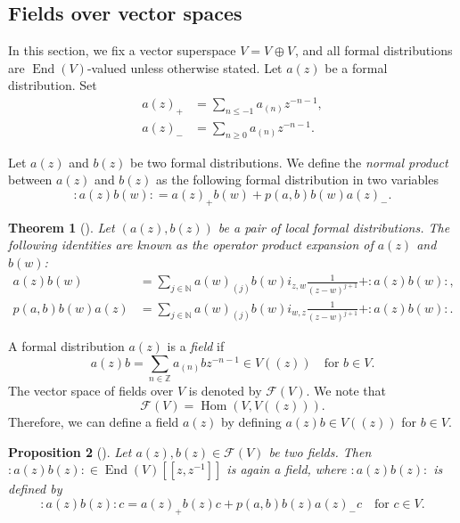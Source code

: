 \documentclass[a4paper, 12pt, reqno]{amsart}
\newtheorem{theorem}{Theorem}[section]
\newtheorem{proposition}[theorem]{Proposition}
\theoremstyle{remark}
\numberwithin{equation}{subsection}
\DeclareMathOperator{\End}{End}
\DeclareMathOperator{\zero}{\overline{0}}
\DeclareMathOperator{\one}{\overline{1}}
\DeclareMathOperator{\Hom}{Hom}
\begin{document}
\subsection{Fields over vector spaces}
\label{sec:fields-over-vector}

In this section, we fix a vector superspace $V = V_{\zero} \oplus V_{\one}$, and all formal distributions are $\End(V)$-valued unless otherwise stated.
Let $a(z)$ be a formal distribution.
Set
\begin{align*}
  a(z)_+ &= \sum_{n \le -1}a_{(n)}z^{-n - 1}, \\
  a(z)_- &= \sum_{n \ge 0}a_{(n)}z^{-n - 1}.
\end{align*}

Let $a(z)$ and $b(z)$ be two formal distributions.
We define the \emph{normal product} between $a(z)$ and $b(z)$ as the following formal distribution in two variables
\begin{equation*}
  :a(z)b(w): = a(z)_+b(w) + p(a, b)b(w)a(z)_-.
\end{equation*}

\begin{theorem}[{\cite[Proposition 3.2.3]{nozaradan_introduction_2008}}]
  \label{thr:11}
  Let $(a(z), b(z))$ be a pair of local formal distributions.
  The following identities are known as the operator product expansion of $a(z)$ and $b(w)$:
  \begin{align*}
    a(z)b(w) &= \sum_{j \in \mathbb{N}}a(w)_{(j)}b(w)i_{z, w}\frac{1}{(z - w)^{j + 1}} + :a(z)b(w):, \\
    p(a, b)b(w)a(z) &= \sum_{j \in \mathbb{N}}a(w)_{(j)}b(w)i_{w, z}\frac{1}{(z - w)^{j + 1}} + :a(z)b(w):.
  \end{align*}
\end{theorem}

A formal distribution $a(z)$ is a \emph{field} if
\begin{equation*}
  a(z)b = \sum_{n \in \mathbb{Z}}a_{(n)}bz^{-n - 1} \in V((z)) \quad \text{for }b \in V.
\end{equation*}
The vector space of fields over $V$ is denoted by $\mathcal{F}(V)$.
We note that
\begin{equation*}
  \mathcal{F}(V) = \Hom(V, V((z))).
\end{equation*}
Therefore, we can define a field $a(z)$ by defining $a(z)b \in V((z))$ for $b \in V$.

\begin{proposition}[{\cite[Proposition 3.3.2]{nozaradan_introduction_2008}}]
  \label{prp:6}
  Let $a(z), b(z) \in \mathcal{F}(V)$ be two fields.
  Then $:a(z)b(z): \in \End(V)[[z,z^{-1}]]$ is again a field, where $:a(z)b(z):$ is defined by
  \begin{equation*}
    :a(z)b(z):c = a(z)_+b(z)c + p(a, b)b(z)a(z)_-c \quad \text{for }c \in V.
  \end{equation*}
\end{proposition}
\end{document}
